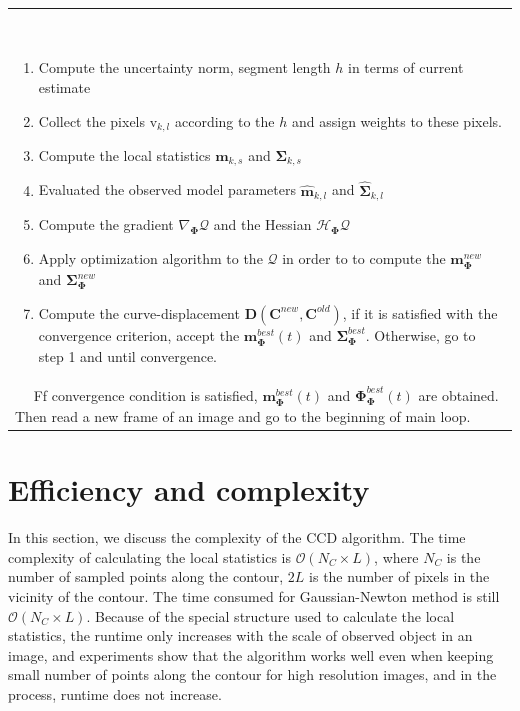 \begin{table}[htbp]
\begin{tabular*}{0.9\textwidth}{!{\color{red} \vrule width 4pt}l}
\parbox{2cm}{$\quad$}\parbox{13cm}
{
  \begin{enumerate}
  \item Compute the uncertainty norm, segment length $h$ in terms of
    current estimate
  \item Collect the pixels $\mathrm{v}_{k,l}$ according to the $h$ and
    assign weights to these pixels.
  \item Compute the local statistics $\mathbf{m}_{k,s}$ and $\mathbf{\Sigma}_{k,s}$
  \item Evaluated the observed model parameters
    $\hat{\mathbf{m}}_{k,l}$ and $\hat{\mathbf{\Sigma}}_{k,l}$
  \item Compute the gradient $\nabla_{\mathbf{\Phi}}\mathcal{Q}$ and the Hessian $\mathcal{H}_{\mathbf{\Phi}}\mathcal{Q}$
  \item Apply optimization algorithm to the  $\mathcal{Q}$ in order to
    to compute the $\mathbf{m}_{\mathbf{\Phi}}^{new}$ and $\mathbf{\Sigma}_{\mathbf{\Phi}}^{new}$
  \item Compute the curve-displacement $\mathbf{D}(\mathbf{C}^{new},
    \mathbf{C}^{old})$, if it is satisfied with the convergence
    criterion, accept the $\mathbf{m}_{\mathbf{\Phi}}^{best}(t)$ and
    $\mathbf{\Sigma}_{\mathbf{\Phi}}^{best}$. Otherwise, go to step 1
    and until convergence.
  \end{enumerate}
}
\\
\parbox{2cm}{$\quad$}\parbox{13cm}
{
Ff convergence condition is satisfied,
$\mathbf{m}_{\mathbf{\Phi}}^{best}(t)$ and
$\mathbf{\Phi}_{\mathbf{\Phi}}^{best}(t)$ are obtained. Then read a
new frame of an image and go to the beginning of main loop.
}
  \end{tabular*}
\end{table}
\section{Efficiency and complexity}
\label{sec:eff}
In this section, we discuss the complexity of the CCD algorithm. 
The time complexity of calculating the local statistics is
$\mathcal{O}(N_{C}\times L)$, where $N_{C}$ is the number of sampled
points along the contour, $2L$ is the number of pixels in the vicinity
of the contour. The time consumed for Gaussian-Newton method is still
$\mathcal{O}(N_{C}\times L)$. Because of the special structure used to
calculate the local statistics, the runtime only increases with the
scale of observed object in an image, and experiments show that the algorithm
works well even when keeping small number of points along the contour for
high resolution images, and in the process, runtime does not increase.

